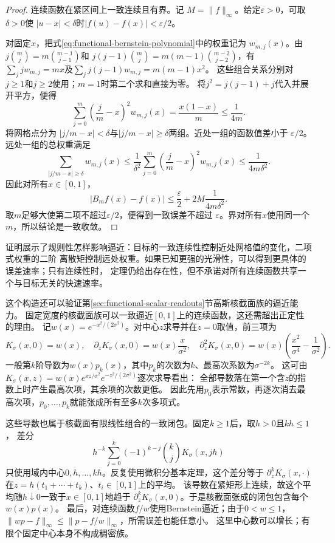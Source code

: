 \begin{proof}
连续函数在紧区间上一致连续且有界。记
$M=\lVert f\rVert_{\infty}$。给定$\varepsilon>0$，可取$\delta>0$使
$|u-x|<\delta$时$|f(u)-f(x)|<\varepsilon/2$。

对固定$x$，把式\eqref{eq:functional-bernstein-polynomial}中的权重记为
$w_{m,j}(x)$。由$j\binom mj=m\binom{m-1}{j-1}$和
$j(j-1)\binom mj=m(m-1)\binom{m-2}{j-2}$，有
$\sum_jj w_{m,j}=mx$及$\sum_jj(j-1)w_{m,j}=m(m-1)x^2$。
这些组合关系分别对$j\geq1$和$j\geq2$使用；$m=1$时第二个求和直接为零。
将$j^2=j(j-1)+j$代入并展开平方，便得
\[
  \sum_{j=0}^{m}
  \left(\frac{j}{m}-x\right)^2w_{m,j}(x)
  =
  \frac{x(1-x)}{m}
  \leq\frac{1}{4m}.
\]
将网格点分为
$|j/m-x|<\delta$与$|j/m-x|\geq\delta$两组。近处一组的函数值差小于
$\varepsilon/2$。远处一组的总权重满足
\[
  \sum_{|j/m-x|\geq\delta}w_{m,j}(x)
  \leq
  \frac{1}{\delta^2}
  \sum_{j=0}^{m}
  \left(\frac{j}{m}-x\right)^2w_{m,j}(x)
  \leq\frac{1}{4m\delta^2}.
\]
因此对所有$x\in[0,1]$，
\[
  |B_mf(x)-f(x)|
  \leq
  \frac{\varepsilon}{2}
  +
  2M\frac{1}{4m\delta^2}.
\]
取$m$足够大使第二项不超过$\varepsilon/2$，便得到一致误差不超过
$\varepsilon$。界对所有$x$使用同一个$m$，所以结论是一致收敛。
\end{proof}

证明展示了规则性怎样影响逼近：目标的一致连续性控制近处网格值的变化，二项式权重的二阶
离散矩控制远处权重。如果已知更强的光滑性，可以得到更具体的误差速率；只有连续性时，
定理仍给出存在性，但不承诺对所有连续函数共享一个与目标无关的快速速率。

这个构造还可以验证第\ref{sec:functional-scalar-readouts}节高斯核截面族的逼近能力。
固定宽度的核截面族可以一致逼近$[0,1]$上的连续函数，这还需超出正定性的理由。
记$w(x)=e^{-x^2/(2\sigma^2)}$。对中心$z$求导并在$z=0$取值，前三项为
\[
 K_\sigma(x,0)=w(x),\quad
 \partial_zK_\sigma(x,0)=w(x)\frac{x}{\sigma^2},\quad
 \partial_z^2K_\sigma(x,0)=w(x)\left(\frac{x^2}{\sigma^4}-\frac1{\sigma^2}\right).
\]
一般第$k$阶导数为$w(x)p_k(x)$，其中$p_k$的次数为$k$、最高次系数为$\sigma^{-2k}$。
这可由$K_\sigma(x,z)=w(x)e^{xz/\sigma^2}e^{-z^2/(2\sigma^2)}$逐次求导看出：
全部导数落在第一个含$z$的指数上时产生最高次项，其余项的次数更低。
因此先用$p_0$表示常数，再逐次消去最高次项，$p_0,\ldots,p_k$就能张成所有至多$k$次多项式。

这些导数也属于核截面有限线性组合的一致闭包。固定$k\geq1$后，取$h>0$且$kh\leq1$，
差分
\[
 h^{-k}\sum_{j=0}^k(-1)^{k-j}\binom kj K_\sigma(x,jh)
\]
只使用域内中心$0,h,\ldots,kh$。反复使用微积分基本定理，这个差分等于
$\partial_z^kK_\sigma(x,\cdot)$在$z=h(t_1+\cdots+t_k)$、$t_i\in[0,1]$上的平均。
该导数在紧矩形上连续，故这个平均随$h\downarrow0$一致于$x\in[0,1]$地趋于
$\partial_z^kK_\sigma(x,0)$。于是核截面张成的闭包包含每个$w(x)p(x)$。
最后，对连续函数$f/w$使用Bernstein逼近；由于$0<w\leq1$，
$\lVert wp-f\rVert_\infty\leq\lVert p-f/w\rVert_\infty$，所需误差也能任意小。
这里中心数可以增长；有限个固定中心本身不构成稠密族。

